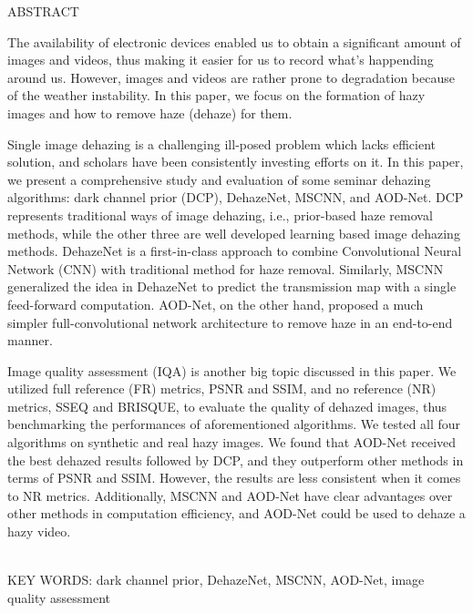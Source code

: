 \documentclass[a4paper, 12pt, oneside]{report}
\newenvironment{englishabstract}[1]
{
\newcommand{\keywords}{#1}
\phantomsection
\addcontentsline{toc}{chapter}{Abstract\quad }

\begin{center}
ABSTRACT
\end{center}
\fontsize{12}{18}\selectfont
}
{
\\[1\baselineskip]
KEY WORDS: \keywords

}
\begin{document}
\begin{englishabstract}{dark channel prior, DehazeNet, MSCNN, AOD-Net, image quality assessment}
\par The availability of electronic devices enabled us to obtain a significant amount of images and videos, thus making it easier for us to record what's happending around us. However, images and videos are rather prone to degradation because of the weather instability. In this paper, we focus on the formation of hazy images and how to remove haze (dehaze) for them.

Single image dehazing is a challenging ill-posed problem which lacks efficient solution, and scholars have been consistently investing efforts on it. In this paper, we present a comprehensive study and evaluation of some seminar dehazing algorithms: dark channel prior (DCP), DehazeNet, MSCNN, and AOD-Net. DCP represents traditional ways of image dehazing, i.e., prior-based haze removal methods, while the other three are well developed learning based image dehazing methods. DehazeNet is a first-in-class approach to combine Convolutional Neural Network (CNN) with traditional method for haze removal. Similarly, MSCNN generalized the idea in DehazeNet to predict the transmission map with a single feed-forward computation. AOD-Net, on the other hand, proposed a much simpler full-convolutional network architecture to remove haze in an end-to-end manner.  

Image quality assessment (IQA) is another big topic discussed in this paper. We utilized full reference (FR) metrics, PSNR and SSIM, and no reference (NR) metrics, SSEQ and BRISQUE, to evaluate the quality of dehazed images, thus benchmarking the performances of aforementioned algorithms. We tested all four algorithms on synthetic and real hazy images. We found that AOD-Net received the best dehazed results followed by DCP, and they outperform other methods in terms of PSNR and SSIM. However, the results are less consistent when it comes to NR metrics. Additionally, MSCNN and AOD-Net have clear advantages over other methods in computation efficiency, and AOD-Net could be used to dehaze a hazy video.   
\end{englishabstract}

\newpage

\pagestyle{empty}
\begingroup
\renewcommand{\leftline}{}
\renewcommand{\thispagestyle}[1]{}
\fontsize{12pt}{18pt} \selectfont
\tableofcontents
\endgroup
\newpage
\end{document}
